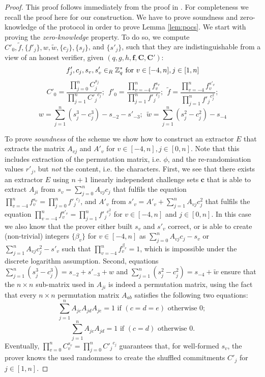 \begin{proof}
This proof follows immediately from the proof in \cite{Furukawa05}.
For completeness we recall the proof here for our construction.
  We have to prove soundness and zero-knowledge of the \PoS protocol in order to prove Lemma \ref{lem:pocs}.
  We start with proving the \emph{zero-knowledge} property.
  To do so, we compute $C'_0, \tilde{f}, \{f'_j\}, w, \tilde{w}, \{c_j\}, \{s_j\}$, and $\{s'_j\}$, such that they are indistinguishable from a view of an honest verifier, given $(q,g,h,\bm f, \bm C, \bm C')$:
  \[
    f'_j, c_j, s_v, s'_v \in_R \mathbb{Z}^\ast_q \text{ for } v\in[-4,n], j\in[1,n]
  \]
  \[
    C'_0 = \frac{\prod_{j=0}^n C_j^{s_j}}{\prod_{j=1}^n {C'_j}^{c_j}};~~
    f'_0 = \frac{\prod_{v=-4}^n f_v^{s_v}}{\prod_{j=1}^n {f'_j}^{c_j}};~~
    \tilde{f} = \frac{\prod_{v=-4}^n f_v^{s'_v}}{\prod_{j=1}^n {f'_j}^{c^2_j}};
  \]
  \[
    w = \sum_{j=1}^n (s_j^3 - c_j^3) - s_{-2} - s'_{-3};~~
    \tilde{w} = \sum_{j=1}^n (s_j^2 - c_j^2) - s_{-4}
  \]

\noindent
To prove \emph{soundness} of the \PoS scheme we show how to construct an extractor $E$ that extracts the matrix $A_{vj}$ and $A'_v$ for $v\in[-4,n], j\in[0,n]$.
  Note that this includes extraction of the permutation matrix, i.e. $\phi$, and the re-randomisation values $r'_j$, but \emph{not} the content, i.e. the characters.
  First, we see that there exists an extractor $E$ using $n+1$ linearly independent challenge sets $\bm c$ that is able to extract $A_{ji}$ from $s_v=\sum_{j=0}^n A_{vj}c_j$ that fulfils the equation $\prod_{v=-4}^n f_v^{s_v}=\prod_{j=0}^n {f'_j}^{c_j}$, and $A'_v$ from $s'_v=A'_v + \sum_{j=1}^n A_{vj}c_j^2$ that fulfils the equation $\prod_{v=-4}^n f_v^{s'_v}=\prod_{j=1}^n {f'_j}^{c^2_j}$ for $v\in[-4,n]$ and $j\in[0,n]$.
  In this case we also know that the prover either built $s_v$ and $s'_v$ correct, or is able to create (non-trivial) integers $\{\beta_v\}$ for $v\in[-4,n]$ as $\sum_{j=0}^n A_{vj}c_j - s_v$ or $\sum_{j=1}^n A_{vj}c^2_j - s'_v$ such that $\prod_{v=-4}^n f_v^{\beta_v} = 1$, which is impossible under the discrete logarithm assumption.
  Second, equations $\sum_{j=1}^n (s_j^3 - c_j^3)=s_{-2} + s'_{-3} + w$ and $\sum_{j=1}^n (s_j^2 - c_j^2)= s_{-4} + \tilde{w}$ ensure that the $n\times n$ sub-matrix used in $A_{ji}$ is indeed a permutation matrix, using the fact that every $n\times n$ permutation matrix $A_{ab}$ satisfies the following two equations:
  \[
    \sum_{j=1}^n A_{jc} A_{jd} A_{je} = 1 \text{ if } (c=d=e) \text{ otherwise } 0; ~
  \]
  \[
    \sum_{j=1}^n A_{jc} A_{jd} = 1 \text{ if } (c=d) \text{ otherwise } 0.
  \]
  Eventually, $\prod_{v=0}^n C_v^{s_v}=\prod_{j=0}^n {C'_j}^{c_j}$ guarantees that, for well-formed $s_v$, the prover knows the used randomness to create the shuffled commitments $C'_j$ for $j\in[1,n]$.
\end{proof}

